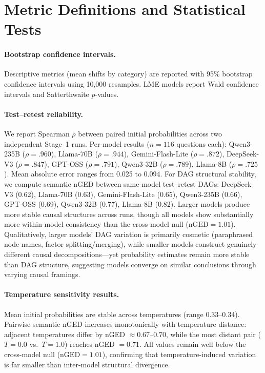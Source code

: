 \documentclass[11pt]{article}
\begin{document}
\section{Metric Definitions and Statistical Tests}
\label{app:metrics}

\paragraph{Bootstrap confidence intervals.} Descriptive metrics (mean shifts by category) are reported with 95\% bootstrap confidence intervals using 10,000 resamples. LME models report Wald confidence intervals and Satterthwaite $p$-values.

\paragraph{Test--retest reliability.} We report Spearman $\rho$ between paired initial probabilities across two independent Stage~1 runs. Per-model results ($n = 116$ questions each): Qwen3-235B ($\rho = .960$), Llama-70B ($\rho = .944$), Gemini-Flash-Lite ($\rho = .872$), DeepSeek-V3 ($\rho = .847$), GPT-OSS ($\rho = .791$), Qwen3-32B ($\rho = .789$), Llama-8B ($\rho = .725$). Mean absolute error ranges from 0.025 to 0.094. For DAG structural stability, we compute semantic nGED between same-model test--retest DAGs: DeepSeek-V3 (0.62), Llama-70B (0.63), Gemini-Flash-Lite (0.65), Qwen3-235B (0.66), GPT-OSS (0.69), Qwen3-32B (0.77), Llama-8B (0.82). Larger models produce more stable causal structures across runs, though all models show substantially more within-model consistency than the cross-model null ($\text{nGED} = 1.01$). Qualitatively, larger models' DAG variation is primarily cosmetic (paraphrased node names, factor splitting/merging), while smaller models construct genuinely different causal decompositions---yet probability estimates remain more stable than DAG structure, suggesting models converge on similar conclusions through varying causal framings.

\paragraph{Temperature sensitivity results.} Mean initial probabilities are stable across temperatures (range 0.33--0.34). Pairwise semantic nGED increases monotonically with temperature distance: adjacent temperatures differ by nGED $\approx 0.67$--$0.70$, while the most distant pair ($T = 0.0$ vs.\ $T = 1.0$) reaches nGED $= 0.71$. All values remain well below the cross-model null ($\text{nGED} = 1.01$), confirming that temperature-induced variation is far smaller than inter-model structural divergence.
\end{document}
